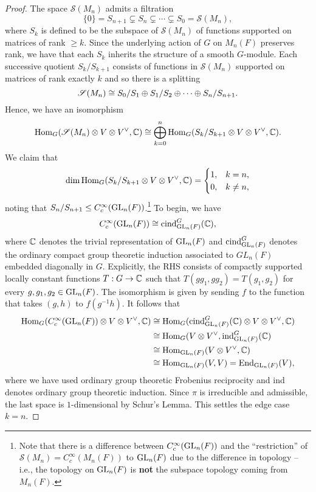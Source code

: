 \documentclass[11pt]{article}
\renewcommand{\S}{\mathscr{S}}
\begin{document}
\begin{proof}
The space $\S(M_n)$ admits a filtration
$$\{0\}=S_{n+1}\subsetneq S_n\subsetneq\cdots\subsetneq S_0=\S(M_n),$$
where $S_k$ is defined to be the subspace of $\S(M_n)$ of functions supported on matrices of rank $\geq k$. Since the underlying action of $G$ on $M_n(F)$ preserves rank, we have that each $S_k$ inherits the structure of a smooth $G$-module. Each successive quotient $S_k/S_{k+1}$ consists of functions in $\S(M_n)$ supported on matrices of rank exactly $k$ and so there is a splitting
$$\S(M_n)\iso S_0/S_1\oplus S_1/S_2\oplus\cdots\oplus S_n/S_{n+1}.$$
Hence, we have an isomorphism
$$\Hom_G(\S(M_n)\tensor V\tensor V^{\vee},\C)\iso\bigoplus_{k=0}^n\Hom_G(S_k/S_{k+1}\tensor V\tensor V^{\vee},\C).$$
We claim that 
\begin{equation*}
\dim\operatorname{Hom}_G(S_k/S_{k+1}\otimes V\otimes V^{\vee},\mathbb{C})=
\begin{cases}
1, & k=n, \\
0, & k\neq n,
\end{cases}
\end{equation*}
noting that $S_n/S_{n+1}\leq C_c^{\infty}(\textup{GL}_n(F))$.\footnote{Note that there is a difference between $C_c^{\infty}(\textup{GL}_n(F))$ and the ``restriction'' of $\S(M_n)=C_c^{\infty}(M_n(F))$ to $\textup{GL}_n(F)$ due to the difference in topology -- i.e., the topology on $\textup{GL}_n(F)$ is \textbf{not} the subspace topology coming from $M_n(F)$.} To begin, we have 
$$C_c^{\infty}(\textup{GL}_n(F))\cong\textup{cind}_{\textup{GL}_n(F)}^G(\mathbb{C}),$$
where $\mathbb{C}$ denotes the trivial representation of $\textup{GL}_n(F)$ and $\textup{cind}_{\textup{GL}_n(F)}^G$ denotes the ordinary compact group theoretic induction associated to $GL_n(F)$ embedded diagonally in $G$. Explicitly, the RHS consists of compactly supported locally constant functions $T: G\to\mathbb{C}$ such that $T(gg_1,gg_2)=T(g_1,g_2)$ for every $g,g_1,g_2\in\textup{GL}_n(F)$. The isomorphism is given by sending $f$ to the function that takes $(g,h)$ to $f(g^{-1}h)$. It follows that 
\begin{align*}
\operatorname{Hom}_G(C_c^{\infty}(\textup{GL}_n(F))\otimes V\otimes V^{\vee},\mathbb{C})
&\cong\operatorname{Hom}_G(\textup{cind}_{\textup{GL}_n(F)}^G(\mathbb{C})\otimes V\otimes V^{\vee},\mathbb{C}) \\
&\cong\operatorname{Hom}_G(V\otimes V^{\vee},\textup{ind}_{\textup{GL}_n(F)}^G(\mathbb{C}) \\
&\cong\operatorname{Hom}_{\textup{GL}_n(F)}(V\otimes V^{\vee},\mathbb{C}) \\
&\cong\operatorname{Hom}_{\textup{GL}_n(F)}(V,V)=\operatorname{End}_{\textup{GL}_n(F)}(V),
\end{align*}
where we have used ordinary group theoretic Frobenius reciprocity and \textup{ind} denotes ordinary group theoretic induction. Since $\pi$ is irreducible and admissible, the last space is $1$-dimensional by Schur's Lemma. This settles the edge case $k=n$.


\end{proof}
\end{document}
